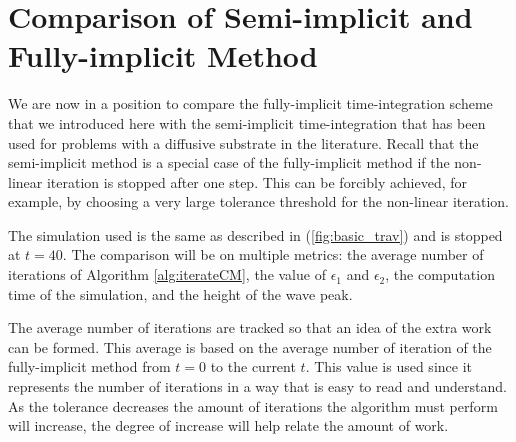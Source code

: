 \section{Comparison of Semi-implicit and Fully-implicit Method}
   We are now in a position to compare the fully-implicit time-integration scheme that we introduced here with the semi-implicit time-integration that has been used for problems with a diffusive substrate in the literature. %
   Recall that the semi-implicit method is a special case of the fully-implicit method if the non-linear iteration is stopped after one step.
   This can be forcibly achieved, for example, by choosing a very large tolerance threshold for the non-linear iteration.

  The simulation used is the same as described in (\ref{fig:basic_trav}) and is stopped at $t = 40$.
  The comparison will be on multiple metrics: the average number of iterations of Algorithm \ref{alg:iterateCM}, the value of $\epsilon_1$ and $\epsilon_2$, the computation time of the simulation, and the height of the wave peak.

  

  The average number of iterations are tracked so that an idea of the extra work can be formed.
  This average is based on the average number of iteration of the fully-implicit method from $t=0$ to the current $t$.
  This value is used since it represents the number of iterations in a way that is easy to read and understand.
  As the tolerance decreases the amount of iterations the algorithm must perform will increase, the degree of increase will help relate the amount of work.


